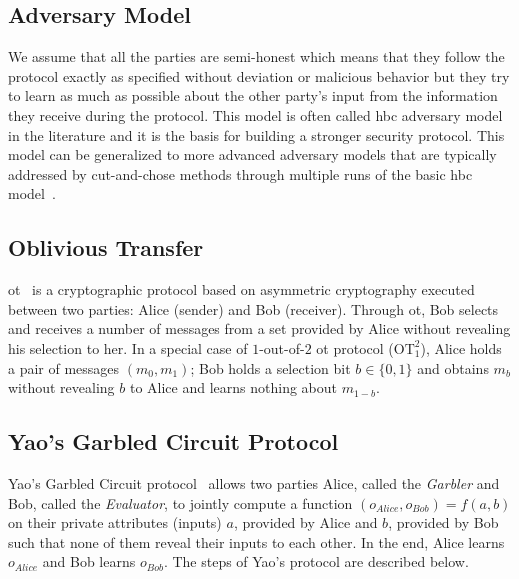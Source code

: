 \subsection{Adversary Model}\label{ssec:prelim-adv}
We assume that all the parties are semi-honest which means that they follow the protocol exactly as specified without deviation or malicious behavior but they try to learn as much as possible about the other party's input from the information they receive during the protocol.
This model is often called \acrfull{hbc} adversary model in the literature and it is the basis for building a stronger security protocol.
This model can be generalized to more advanced adversary models that are typically addressed by cut-and-chose methods through multiple runs of the basic \acrshort{hbc} model~\cite{lindell2007efficient, lindell2012secure, nielsen2009lego}.

\subsection{Oblivious Transfer}\label{ssec:prelim-ot}
\acrfull{ot}~\cite{naor2005computationally} is a cryptographic protocol based on asymmetric cryptography executed between two parties: Alice (sender) and Bob (receiver).
Through \acrshort{ot}, Bob selects and receives a number of messages from a set provided by Alice without revealing his selection to her.
In a special case of $1$-out-of-$2$ \acrshort{ot} protocol ($\textrm{OT}^2_1$), Alice holds a pair of messages $(m_{0}, m_{1})$; Bob holds a selection bit $b \in \{0, 1\}$ and obtains $m_{b}$ without revealing $b$ to Alice and learns nothing about $m_{1-b}$.

\subsection{Yao's Garbled Circuit Protocol}\label{ssec:prelim-gc}
Yao's Garbled Circuit protocol~\cite{yao1986generate} allows two parties Alice, called the \textit{Garbler} and Bob, called the \textit{Evaluator}, to jointly compute a function $(o_{Alice}, o_{Bob}) = f(a, b)$ on their private attributes (inputs) $a$, provided by Alice and $b$, provided by Bob such that none of them reveal their inputs to each other.
In the end, Alice learns $o_{Alice}$ and Bob learns $o_{Bob}$.
The steps of Yao's protocol are described below.

